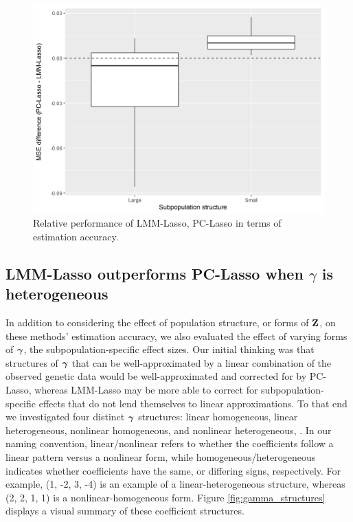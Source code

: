 \begin{figure}[H]
    \centering
    \includegraphics[scale = 0.7]{figures/fig2a}
    \caption{Relative performance of LMM-Lasso, PC-Lasso in terms of estimation accuracy.}
    \label{fig:big_vs_small}
\end{figure}


\subsection{LMM-Lasso outperforms PC-Lasso when $\gamma$ is heterogeneous}

In addition to considering the effect of population structure, or forms of $\textbf{Z}$, on these methods' estimation accuracy, we also evaluated the effect of varying forms of $\boldsymbol{\gamma}$, the subpopulation-specific effect sizes. Our initial thinking was that structures of $\boldsymbol{\gamma}$ that can be well-approximated by a linear combination of the observed genetic data would be well-approximated and corrected for by PC-Lasso, whereas LMM-Lasso may be more able to correct for subpopulation-specific effects that do not lend themselves to linear approximations. To that end we investigated four distinct $\boldsymbol{\gamma}$ structures: linear homogeneous, linear heterogeneous, nonlinear homogeneous, and nonlinear heterogeneous, . In our naming convention, linear/nonlinear refers to whether the coefficients follow a linear pattern versus a nonlinear form, while homogeneous/heterogeneous indicates whether coefficients have the same, or differing signs, respectively. For example, (1, -2, 3, -4) is an example of a linear-heterogeneous structure, whereas (2, 2, 1, 1) is a nonlinear-homogeneous form. Figure \ref{fig:gamma_structures} displays a visual summary of these coefficient structures. \\

